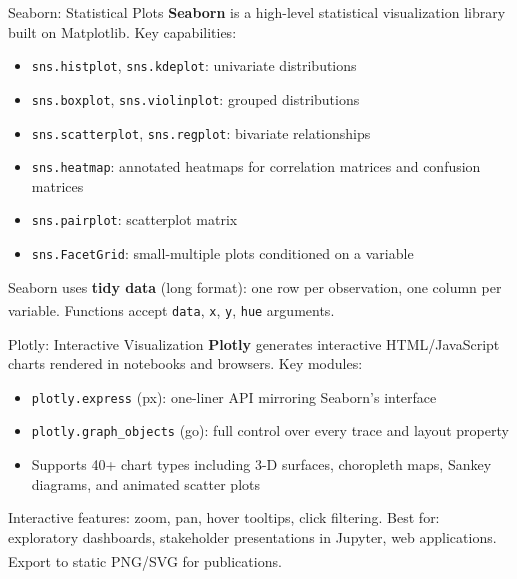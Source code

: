 \begin{v3topic}{Seaborn: Statistical Plots}
    \textbf{Seaborn} is a high-level statistical visualization library built on Matplotlib.
    Key capabilities:
    \begin{itemize}
        \item \texttt{sns.histplot}, \texttt{sns.kdeplot}: univariate distributions
        \item \texttt{sns.boxplot}, \texttt{sns.violinplot}: grouped distributions
        \item \texttt{sns.scatterplot}, \texttt{sns.regplot}: bivariate relationships
        \item \texttt{sns.heatmap}: annotated heatmaps for correlation matrices and
              confusion matrices
        \item \texttt{sns.pairplot}: scatterplot matrix
        \item \texttt{sns.FacetGrid}: small-multiple plots conditioned on a variable
    \end{itemize}
    Seaborn uses \textbf{tidy data} (long format): one row per observation, one column
    per variable. Functions accept \texttt{data}, \texttt{x}, \texttt{y},
    \texttt{hue} arguments\textsuperscript{\cite[][pp.~165--195]{molinHandsonDataAnalysis2021}}.

\end{v3topic}
\begin{v3topic}{Plotly: Interactive Visualization}
    \textbf{Plotly} generates interactive HTML/JavaScript charts rendered in notebooks and
    browsers. Key modules:
    \begin{itemize}
        \item \texttt{plotly.express} (px): one-liner API mirroring Seaborn's interface
        \item \texttt{plotly.graph\_objects} (go): full control over every trace and layout
              property
        \item Supports 40+ chart types including 3-D surfaces, choropleth maps, Sankey
              diagrams, and animated scatter plots
    \end{itemize}
    Interactive features: zoom, pan, hover tooltips, click filtering.
    Best for: exploratory dashboards, stakeholder presentations in Jupyter,
    web applications. Export to static PNG/SVG for
    publications\textsuperscript{\cite[][pp.~1--20]{loducaDataStorytellingAltair2024}}.

\end{v3topic}
